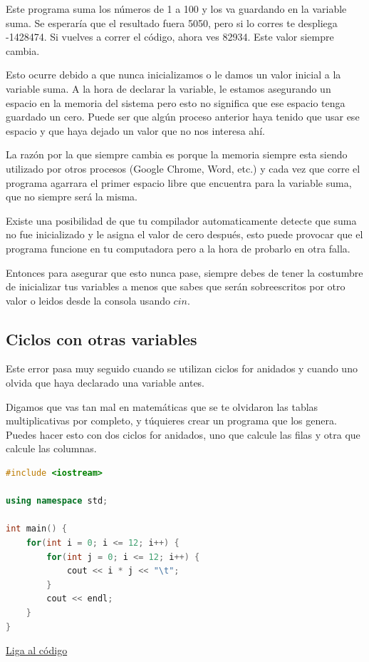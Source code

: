 \documentclass{article}
\begin{document}
Este programa suma los números de 1 a 100 y los va guardando en la variable suma. Se esperaría que el resultado fuera 5050, pero si lo corres te despliega -1428474. Si vuelves a correr el código, ahora ves 82934. Este valor siempre cambia.

Esto ocurre debido a que nunca inicializamos o le damos un valor inicial a la variable suma. A la hora de declarar la variable, le estamos asegurando un espacio en la memoria del sistema pero esto no significa que ese espacio tenga guardado un cero. Puede ser que algún proceso anterior haya tenido que usar ese espacio y que haya dejado un valor que no nos interesa ahí.

La razón por la que siempre cambia es porque la memoria siempre esta siendo utilizado por otros procesos (Google Chrome, Word, etc.) y cada vez que corre el programa agarrara el primer espacio libre que encuentra para la variable suma, que no siempre será la misma.

Existe una posibilidad de que tu compilador automaticamente detecte que suma no fue inicializado y le asigna el valor de cero después, esto puede provocar que el programa funcione en tu computadora pero a la hora de probarlo en otra falla.

Entonces para asegurar que esto nunca pase, siempre debes de tener la costumbre de inicializar tus variables a menos que sabes que serán sobreescritos por otro valor o leidos desde la consola usando $cin$.

\subsection{Ciclos con otras variables}
Este error pasa muy seguido cuando se utilizan ciclos for anidados y cuando uno olvida que haya declarado una variable antes.

Digamos que vas tan mal en matemáticas que se te olvidaron las tablas multiplicativas por completo, y túquieres crear un programa que los genera. Puedes hacer esto con dos ciclos for anidados, uno que calcule las filas y otra que calcule las columnas.

\begin{lstlisting}[language=C++, title=Ciclos con otras variables]
#include <iostream>

using namespace std;

int main() {
	for(int i = 0; i <= 12; i++) {
		for(int j = 0; i <= 12; i++) {
			cout << i * j << "\t";
		}
		cout << endl;
	}
}
\end{lstlisting}
\href{https://repl.it/@Jamesscn/Tablas-de-Falsedad}{Liga al código}\\
\end{document}
